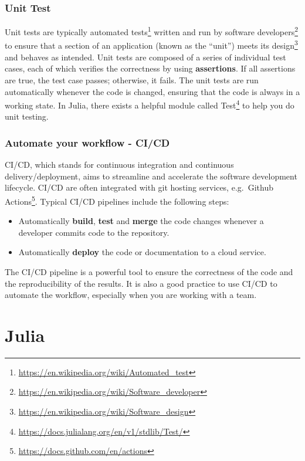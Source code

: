 \documentclass[
  notoc %
]{tufte-book}
\DeclareRobustCommand{\href}[2]{#2\footnote{\url{#1}}}
\providecommand{\tightlist}{%
  \setlength{\itemsep}{0pt}\setlength{\parskip}{0pt}
}
\begin{document}
\hypertarget{unit-test}{%
\subsection{Unit Test}\label{unit-test}}

Unit tests are typically
\href{https://en.wikipedia.org/wiki/Automated_test}{automated tests}
written and run by
\href{https://en.wikipedia.org/wiki/Software_developer}{software
developers} to ensure that a section of an application (known as the
``unit'') meets its
\href{https://en.wikipedia.org/wiki/Software_design}{design} and behaves
as intended. Unit tests are composed of a series of individual test
cases, each of which verifies the correctness by using
\textbf{assertions}. If all assertions are true, the test case passes;
otherwise, it fails. The unit tests are run automatically whenever the
code is changed, ensuring that the code is always in a working state. In
Julia, there exists a helpful module called
\href{https://docs.julialang.org/en/v1/stdlib/Test/}{Test} to help you
do unit testing.

\hypertarget{automate-your-workflow---cicd}{%
\subsection{Automate your workflow -
CI/CD}\label{automate-your-workflow---cicd}}

CI/CD, which stands for continuous integration and continuous
delivery/deployment, aims to streamline and accelerate the software
development lifecycle. CI/CD are often integrated with git hosting
services, e.g.~\href{https://docs.github.com/en/actions}{Github
Actions}. Typical CI/CD pipelines include the following steps:

\begin{itemize}
\tightlist
\item
  Automatically \textbf{build}, \textbf{test} and \textbf{merge} the
  code changes whenever a developer commits code to the repository.
\item
  Automatically \textbf{deploy} the code or documentation to a cloud
  service.
\end{itemize}

The CI/CD pipeline is a powerful tool to ensure the correctness of the
code and the reproducibility of the results. It is also a good practice
to use CI/CD to automate the workflow, especially when you are working
with a team.

\hypertarget{sec:julia}{%
\chapter{Julia}\label{sec:julia}}
\end{document}
